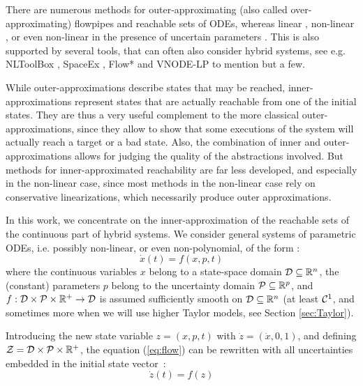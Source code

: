\documentclass{sig-alternate-05-2015} %
\def\R{{\mathbb R}}
\begin{document}
There are numerous methods for outer-approximating (also called over-approximating) flowpipes
and reachable sets of ODEs, whereas linear \cite{GirardLinear06,LeGuernic09}, non-linear \cite{Nedialkov99,Dang4,Dang3}, or even non-linear
in the presence of uncertain parameters \cite{GirardHSCC2005}. This is also 
supported by several tools,
that can often also consider hybrid systems, see e.g. NLToolBox \cite{NLTOOLBOX}, 
SpaceEx \cite{SPACEEX}, Flow* \cite{FLOW} and VNODE-LP \cite{VNODELP} to mention but a few.  

While outer-approximations describe states that may be rea\-ched, inner-approximations represent
states that are actually reachable from one of the initial states. They are
thus a very useful complement to the more classical outer-approxima\-tions, since they allow to show
that some executions of the system will actually reach a target or a bad state. Also, the combination of
inner and outer-approximations allows for judging the quality of the abstractions involved. 
But methods for inner-approximated reachability are far less developed, and especially in the non-linear case, 
since most methods in the non-linear case rely on conservative linearizations, which necessarily produce outer approximations.

In this work, we concentrate on the inner-approximation of the reachable sets of
the continuous part of hybrid systems. %
We consider general systems of parametric ODEs, i.e. possibly non-linear, or
even non-polyno\-mial, of the form : 
\begin{equation}
\dot{x}(t) = f(x,p,t)
\label{eq:flow}
\end{equation}
\noindent where the continuous variables $x$ belong to a state-space domain 
${\cal D} \subseteq \R^n$, the (constant) parameters $p$ belong to the uncertainty domain
${\cal P} \subseteq \R^p$, and 
$f: {\cal D} \times {\cal P} \times \R^+ \rightarrow {\cal D}$ is assumed sufficiently smooth 
on ${\cal D} \subseteq \R^n$ (at least ${\cal C}^1$, and sometimes more when we will use higher
Taylor models, see Section \ref{sec:Taylor}).

Introducing the new state variable $z=(x,p,t)$ with $\dot z = (\dot x,0,1)$, and defining ${\cal Z} = {\cal D} \times {\cal P} \times \R^+$,
the equation (\ref{eq:flow}) can be rewritten with all uncertainties embedded in the initial state vector~:
\begin{equation} \dot z(t) = f(z)
\label{eq:flowb}
\end{equation}
\end{document}
